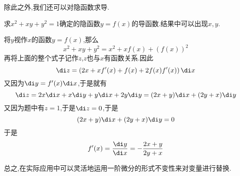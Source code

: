 \documentclass{ctexart}
\begin{document}
除此之外,我们还可以对隐函数求导.
\begin{exercise}[E.0A.4]
    求$x^2+xy+y^2=1$确定的隐函数$y=f(x)$的导函数.结果中可以出现$x,y$.
\end{exercise}
\begin{solution}
    将$y$视作$x$的函数$y=f(x)$,那么
    \[x^2+xy+y^2=x^2+xf(x)+\left(f(x)\right)^2\]
    再将上面的整个式子记作$z$,$z$也与$x$有函数关系.因此
    \[\di z=\left(2x+xf'(x)+f(x)+2f(x)f'(x)\right)\di x\]
    又因为$\di y=f'(x)\di x$,于是就有
    \[\di z=2x\di x+x\di y+y\di x+2y\di y=(2x+y)\di x+(2y+x)\di y\]
    又因为题中有$z=1$,于是$\di z=0$,于是
    \[(2x+y)\di x+(2y+x)\di y=0\]
    于是
    \[f'(x)=\dfrac{\di y}{\di x}=-\dfrac{2x+y}{2y+x}\]

\end{solution}
总之,在实际应用中可以灵活地运用一阶微分的形式不变性来对变量进行替换.
\end{document}
